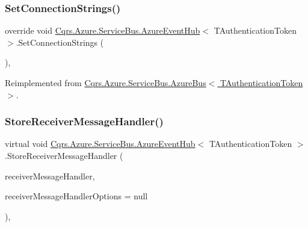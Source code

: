 \mbox{\label{classCqrs_1_1Azure_1_1ServiceBus_1_1AzureEventHub_af823e573f3acc3fa9949969499309db1_af823e573f3acc3fa9949969499309db1}} 
\subsubsection{\texorpdfstring{Set\+Connection\+Strings()}{SetConnectionStrings()}}
{\footnotesize\ttfamily override void \hyperlink{classCqrs_1_1Azure_1_1ServiceBus_1_1AzureEventHub}{Cqrs.\+Azure.\+Service\+Bus.\+Azure\+Event\+Hub}$<$ T\+Authentication\+Token $>$.Set\+Connection\+Strings (\begin{DoxyParamCaption}{ }\end{DoxyParamCaption})\hspace{0.3cm}{\ttfamily [protected]}, {\ttfamily [virtual]}}



Reimplemented from \hyperlink{classCqrs_1_1Azure_1_1ServiceBus_1_1AzureBus_a8a1be9145b0a92c0037ef1b8b4cc79d9_a8a1be9145b0a92c0037ef1b8b4cc79d9}{Cqrs.\+Azure.\+Service\+Bus.\+Azure\+Bus$<$ T\+Authentication\+Token $>$}.

\mbox{\label{classCqrs_1_1Azure_1_1ServiceBus_1_1AzureEventHub_a5924517b1e88c09e3c0c1aec9c737a8d_a5924517b1e88c09e3c0c1aec9c737a8d}} 
\subsubsection{\texorpdfstring{Store\+Receiver\+Message\+Handler()}{StoreReceiverMessageHandler()}}
{\footnotesize\ttfamily virtual void \hyperlink{classCqrs_1_1Azure_1_1ServiceBus_1_1AzureEventHub}{Cqrs.\+Azure.\+Service\+Bus.\+Azure\+Event\+Hub}$<$ T\+Authentication\+Token $>$.Store\+Receiver\+Message\+Handler (\begin{DoxyParamCaption}\item[{Action$<$ Partition\+Context, Event\+Data $>$}]{receiver\+Message\+Handler,  }\item[{Event\+Processor\+Options}]{receiver\+Message\+Handler\+Options = {\ttfamily null} }\end{DoxyParamCaption})\hspace{0.3cm}{\ttfamily [protected]}, {\ttfamily [virtual]}}

